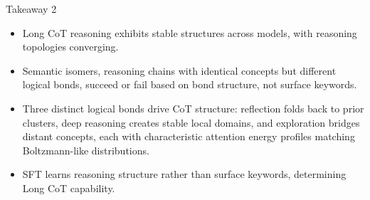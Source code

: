 \begin{TakeawayBox}{Takeaway 2}
\begin{itemize}[leftmargin=16pt, itemsep=0pt, topsep=0pt]
    \item Long CoT reasoning exhibits stable structures across models, with reasoning topologies converging.
    \item Semantic isomers, reasoning chains with identical concepts but different logical bonds, succeed or fail based on bond structure, not surface keywords.
    \item Three distinct logical bonds drive CoT structure: reflection folds back to prior clusters, deep reasoning creates stable local domains, and exploration bridges distant concepts, each with characteristic attention energy profiles matching Boltzmann-like distributions.
    \item SFT learns reasoning structure rather than surface keywords, determining Long CoT capability.
\end{itemize}
\end{TakeawayBox}
